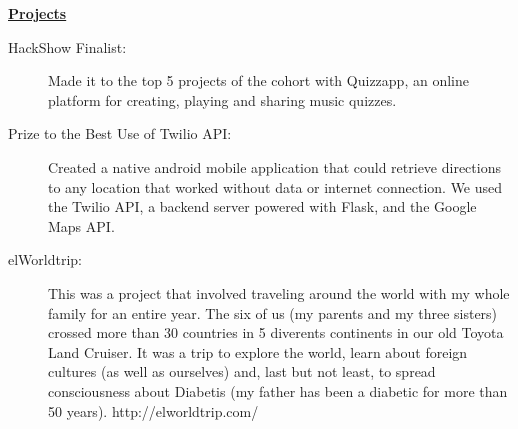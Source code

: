 \documentclass[letterpaper,11pt]{article}
\newcommand{\resheading}[1]{{\large \colorbox{mygrey}{\begin{minipage}{\textwidth}{\textbf{#1 \vphantom{p\^{E}}}}\end{minipage}}}}
\begin{document}
\resheading{\href{http://www.derekhildreth.com/portfolio.php}{Projects}}

\begin{description}
\item[HackShow Finalist:] { \footnotesize Made it to the top 5 projects of the cohort with Quizzapp, an online platform for creating, playing and sharing music quizzes.}

\item[Prize to the Best Use of Twilio API:] { \footnotesize Created a native android mobile application that could retrieve directions to any location that worked without data or internet connection. We used the Twilio API, a backend server powered with Flask, and the Google Maps API.}

\item[elWorldtrip:] { \footnotesize This was a project that involved traveling around the world with my whole family for an entire year. The six of us (my parents and my three sisters) crossed more than 30 countries in 5 diverents continents in our old Toyota Land Cruiser. It was a trip to explore the world, learn about foreign cultures (as well as ourselves) and, last but not least, to spread consciousness about Diabetis (my father has been a diabetic for more than 50 years). http://elworldtrip.com/}

\end{description}
\end{document}
